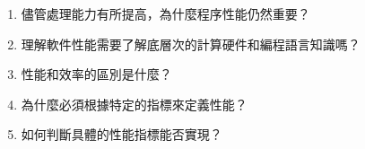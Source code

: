 \begin{enumerate}
\item 儘管處理能力有所提高，為什麼程序性能仍然重要？
\item 理解軟件性能需要了解底層次的計算硬件和編程語言知識嗎？
\item 性能和效率的區別是什麼？
\item 為什麼必須根據特定的指標來定義性能？
\item 如何判斷具體的性能指標能否實現？
\end{enumerate}